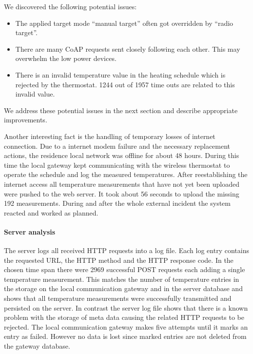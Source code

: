 We discovered the following potential issues:
\begin{itemize}
	\item The applied target mode ``manual target'' often got overridden by ``radio target''.
	\item There are many CoAP requests sent closely following each other. This may overwhelm the low power devices.
	\item There is an invalid temperature value in the heating schedule which is rejected by the thermostat. 1244 out of 1957 time outs are related to this invalid value.
\end{itemize}

We address these potential issues in the next section and describe appropriate improvements.

Another interesting fact is the handling of temporary losses of internet connection.
Due to a internet modem failure and the necessary replacement actions, the residence local network was offline for about 48 hours.
During this time the local gateway kept communicating with the wireless thermostat to operate the schedule and log the measured temperatures.
After reestablishing the internet access all temperature measurements that have not yet been uploaded were pushed to the web server.
It took about 56 seconds to upload the missing 192 measurements.
During and after the whole external incident the system reacted and worked as planned.

\paragraph{Server analysis}


The server logs all received HTTP requests into a log file.
Each log entry contains the requested URL, the HTTP method and the HTTP response code.
In the chosen time span there were 2969 successful POST requests each adding a single temperature measurement.
This matches the number of temperature entries in the storage on the local communication gateway and in the server database and shows that all temperature measurements were successfully transmitted and persisted on the server.
In contrast the server log file shows that there is a known problem with the storage of meta data causing the related HTTP requests to be rejected.
The local communication gateway makes five attempts until it marks an entry as failed.
However no data is lost since marked entries are not deleted from the gateway database.



